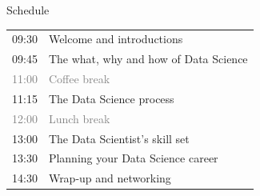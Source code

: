 \begin{frame}{Schedule}
    \begin{center}
        \begin{tabular}{rl}
            \toprule
            09:30 & Welcome and introductions \\
            09:45 & The what, why and how of Data Science \\
            \textcolor{gray}{11:00} & \textcolor{gray}{Coffee break} \\
            11:15 & The Data Science process \\
            \textcolor{gray}{12:00} & \textcolor{gray}{Lunch break} \\
            13:00 & The Data Scientist's skill set \\
            13:30 & Planning your Data Science career \\
            14:30 & Wrap\hyp{}up and networking \\
            \bottomrule
        \end{tabular}
    \end{center}
\end{frame}




